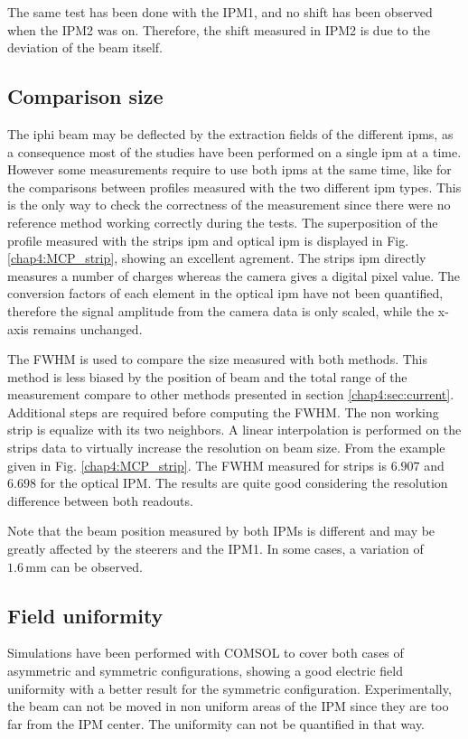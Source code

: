 \begin{refsection}
  The same test has been done with the IPM1, and no shift has been observed when the IPM2 was on. Therefore, the shift measured in IPM2 is due to the deviation of the beam itself.

  

  \subsection{Comparison size }
  The \acrshort{iphi} beam may be deflected by the extraction fields of the different \acrshort{ipm}s, as a consequence most of the studies have been performed on a single \acrshort{ipm} at a time. However some measurements require to use both \acrshort{ipm}s at the same time, like for the comparisons between profiles measured with the two different \acrshort{ipm} types. This is the only way to check the correctness of the measurement since there were no reference method working correctly during the tests.
  The superposition of the profile measured with the strips \acrshort{ipm} and optical \acrshort{ipm} is displayed in Fig. \ref{chap4:MCP_strip}, showing an excellent agrement. The strips \acrshort{ipm} directly measures a number of charges whereas the camera gives a digital pixel value. The conversion factors of each element in the optical \acrshort{ipm} have not been quantified, therefore the signal amplitude from the camera data is only scaled, while the x-axis remains unchanged.
  
  The FWHM is used to compare the size measured with both methods. This method is less biased by the position of beam and the total range of the measurement
  compare to other methods presented in section \ref{chap4:sec:current}.
  Additional steps are required before computing the FWHM.
  The non working strip is equalize with its two neighbors. A linear interpolation is performed on the strips data to virtually increase the resolution on beam size. From the example given in Fig. \ref{chap4:MCP_strip}. The FWHM measured for strips is $6.907$ and $6.698$ for the optical IPM.
  The results are quite good considering the resolution difference between both readouts.
  
  Note that the beam position measured by both IPMs is different and may be greatly affected by the steerers and the IPM1. In some cases, a variation of $1.6\,\mathrm{mm}$ can be observed.

  

  \subsection{Field uniformity}
  \label{chap4:sec:field_uniformity}
  Simulations have been performed with COMSOL to cover both cases of asymmetric and symmetric configurations, showing a good electric field uniformity with a better result for the symmetric configuration. Experimentally, the beam can not be moved in non uniform areas of the IPM since they are too far from the IPM center. The uniformity can not be quantified in that way.


\end{refsection}
